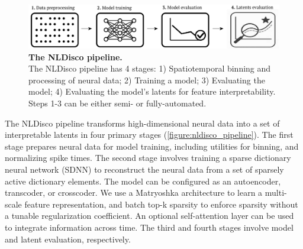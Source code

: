 \documentclass{article}
\begin{document}
\begin{figure}[h]
    \centering
    \includegraphics[width=\linewidth]{../figures/nldisco_pipeline.pdf}
    \caption{
        \textbf{The NLDisco pipeline.} \\
        \small The NLDisco pipeline has 4 stages: 1) Spatiotemporal binning and processing of neural data; 2) Training a model; 3) Evaluating the model; 4) Evaluating the model's latents for feature interpretability. Steps 1-3 can be either semi- or fully-automated.
        \vspace{-1em}
    }
    \label{figure:nldisco_pipeline}
\end{figure}

The NLDisco pipeline transforms high-dimensional neural data into a set of interpretable latents in four primary stages (\autoref{figure:nldisco_pipeline}). The first stage prepares neural data for model training, including utilities for binning, and normalizing spike times. The second stage involves training a sparse dictionary neural network (SDNN) to reconstruct the neural data from a set of sparsely active dictionary elements. The model can be configured as an autoencoder, transcoder, or crosscoder. We use a Matryoshka architecture to learn a multi-scale feature representation, and batch top-k sparsity to enforce sparsity without a tunable regularization coefficient. An optional self-attention layer can be used to integrate information across time. The third and fourth stages involve model and latent evaluation, respectively.
\end{document}
